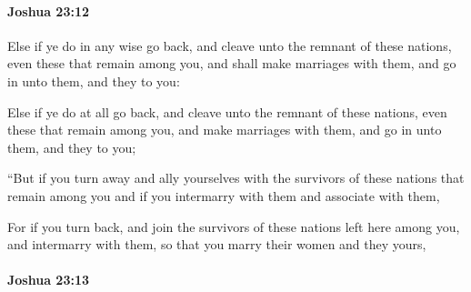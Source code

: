 		\paragraph{Joshua 23:12} %
			\label{JOSHUA-23-12}

			Else if ye do in any wise go back, and cleave unto the remnant of these nations, even these that remain among you, and shall make marriages with them, and go in unto them, and they to you:

			\begin{versebox}
					\item[BHS] 
					\item[ASV] Else if ye do at all go back, and cleave unto the remnant of these nations, even these that remain among you, and make marriages with them, and go in unto them, and they to you;
					\item[NIV] “But if you turn away and ally yourselves with the survivors of these nations that remain among you and if you intermarry with them and associate with them,
					\item[NRSV] For if you turn back, and join the survivors of these nations left here among you, and intermarry with them, so that you marry their women and they yours,
			\end{versebox}

		\paragraph{Joshua 23:13} %
			\label{JOSHUA-23-13}

